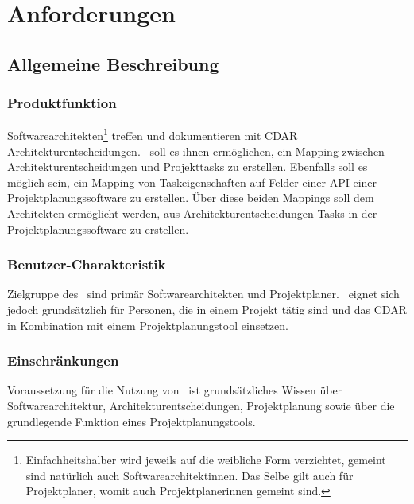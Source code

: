 \chapter{Anforderungen}
\section{Allgemeine Beschreibung}

\subsection{Produktfunktion}
Softwarearchitekten\footnote{Einfachheitshalber wird jeweils auf die weibliche Form verzichtet, gemeint sind natürlich auch Softwarearchitektinnen. Das Selbe gilt auch für Projektplaner, womit auch Projektplanerinnen gemeint sind.} treffen und dokumentieren mit CDAR Architekturentscheidungen.
\eeppi\ soll es ihnen ermöglichen, ein Mapping zwischen Architekturentscheidungen und Projekttasks zu erstellen.
Ebenfalls soll es möglich sein, ein Mapping von Taskeigenschaften auf Felder einer API einer Projektplanungssoftware zu erstellen.
Über diese beiden Mappings soll dem Architekten ermöglicht werden, aus Architekturentscheidungen Tasks in der Projektplanungssoftware zu erstellen.

\subsection{Benutzer-Charakteristik}
Zielgruppe des \eeppi\ sind primär Softwarearchitekten und Projektplaner. \eeppi\ eignet sich jedoch grundsätzlich für Personen, die in einem Projekt tätig sind und das CDAR in Kombination mit einem Projektplanungstool einsetzen.

\subsection{Einschränkungen}
Voraussetzung für die Nutzung von \eeppi\ ist grundsätzliches Wissen über Softwarearchitektur, Architekturentscheidungen, Projektplanung sowie über die grundlegende Funktion eines Projektplanungstools.

